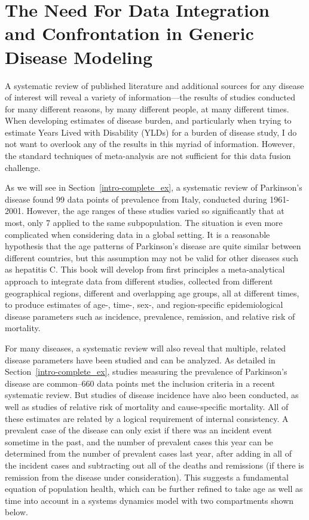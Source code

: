 \section[Need for Confrontation]{The Need For Data Integration and Confrontation in Generic Disease Modeling}

A systematic review of published literature and additional sources for
any disease of interest will reveal a variety of information---the
results of studies conducted for many different reasons, by many
different people, at many different times. When developing estimates
of disease burden, and particularly when trying to estimate Years
Lived with Disability (YLDs) for a burden of disease study, I do not
want to overlook any of the results in this myriad of
information. However, the standard techniques of meta-analysis are
not sufficient for this data fusion challenge.

As we will see in Section~\ref{intro-complete_ex}, a systematic review of Parkinson's disease found 99 data points of prevalence from Italy,
conducted during 1961-2001.  However, the age ranges of these
studies varied so significantly that at most, only 7 applied to the
same subpopulation.  The situation is even more complicated when
considering data in a global setting. It is a reasonable hypothesis
that the age patterns of Parkinson's disease are quite similar between different countries, but this assumption may not be valid for other diseases such as hepatitis C.
This book will develop from first principles a
meta-analytical approach to integrate data from different studies,
collected from different geographical regions, different and
overlapping age groups, all at different times, to produce estimates
of age-, time-, sex-, and region-specific epidemiological disease
parameters such as incidence, prevalence, remission, and relative risk
of mortality.

For many diseases, a systematic review will also reveal that multiple,
related disease parameters have been studied and can be analyzed. As
detailed in Section~\ref{intro-complete_ex}, studies measuring the prevalence of
Parkinson's disease are common--660 data points met the
inclusion criteria in a recent systematic review. But studies of
disease incidence have also been conducted, as well as studies of
relative risk of mortality and cause-specific mortality. All of these
estimates are related by a logical requirement of internal
consistency.  A prevalent case of the disease can only exist if there
was an incident event sometime in the past, and the number of
prevalent cases this year can be determined from the number of
prevalent cases last year, after adding in all of the incident cases
and subtracting out all of the deaths and remissions (if there is
remission from the disease under consideration).  This suggests a
fundamental equation of population health, which can be further
refined to take age as well as time into account in a systems dynamics
model with two compartments shown below.

